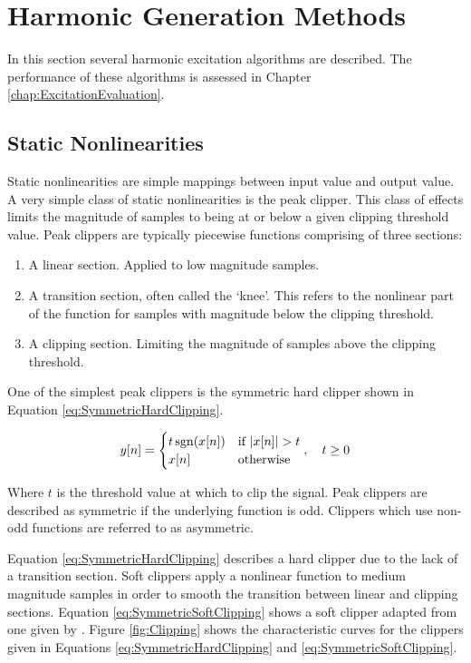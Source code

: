 \section{Harmonic Generation Methods}
\label{sec:Excitation-Methods}
	In this section several harmonic excitation algorithms are described. The performance of these algorithms is
	assessed in Chapter \ref{chap:ExcitationEvaluation}.

	\subsection{Static Nonlinearities}
	\label{sec:Excitation-Methods-Statics}
		Static nonlinearities are simple mappings between input value and output value. A very simple class of
		static nonlinearities is the peak clipper. This class of effects limits the magnitude of samples to being
		at or below a given clipping threshold value. Peak clippers are typically piecewise functions comprising of
		three sections:

		\begin{enumerate}
			\item A linear section. Applied to low magnitude samples.
			\item A transition section, often called the `knee'. This refers to the nonlinear part of the
				function for samples with magnitude below the clipping threshold.
			\item A clipping section. Limiting the magnitude of samples above the clipping threshold.
		\end{enumerate}

		One of the simplest peak clippers is the symmetric hard clipper shown in Equation
		\ref{eq:SymmetricHardClipping}.

		\begin{equation}
			y[n] = \begin{cases}
				t\operatorname{sgn}(x[n]) & \text{if $\left|x[n]\right| > t$} \\
				x[n] & \text{otherwise}
			\end{cases}, \quad t \geq 0
			\label{eq:SymmetricHardClipping}
		\end{equation}

		Where $t$ is the threshold value at which to clip the signal. Peak clippers are described as symmetric if
		the underlying function is odd. Clippers which use non-odd functions are referred to as asymmetric.

		Equation \ref{eq:SymmetricHardClipping} describes a hard clipper due to the lack of a transition section.
		Soft clippers apply a nonlinear function to medium magnitude samples in order to smooth the transition
		between linear and clipping sections. Equation \ref{eq:SymmetricSoftClipping} shows a soft clipper adapted
		from one given by \citet{dutilleux2011nonlinear}. Figure \ref{fig:Clipping} shows the characteristic curves
		for the clippers given in Equations \ref{eq:SymmetricHardClipping} and \ref{eq:SymmetricSoftClipping}.

